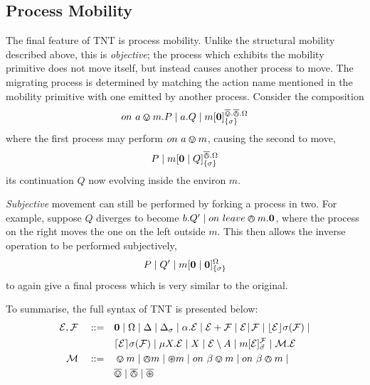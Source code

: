 \documentclass{acm_proc_article-sp}
\begin{document}
\subsection{Process Mobility}
\label{procmob}

The final feature of TNT is process mobility. Unlike the structural
mobility described above, this is \emph{objective}; the process which
exhibits the mobility primitive does not move itself, but instead causes
another process to move.  The migrating process is determined by
matching the action name mentioned in the mobility primitive with one
emitted by another process.  Consider the composition
\begin{displaymath}
  on\ a \varovee m.P \mid a.Q \mid {m}[ \textbf{0} ]^{\overline{\varovee}.\overline{\varowedge}.\Omega}_{\{\sigma\}}
\end{displaymath}
where the first process may perform $on\ a \varovee m$, causing the second
to move,
\begin{displaymath}
P \mid {m}[ \textbf{0} \mid Q ]^{\overline{\varowedge}.\Omega}_{\{\sigma\}}
\end{displaymath}
its continuation $Q$ now evolving inside the environ $m$.

\emph{Subjective} movement can still be performed by forking a process
in two. For example, suppose $Q$ diverges to become $b.Q' \mid
on\ leave \varowedge m.\textbf{0}$, where the process on the right moves the one
on the left outside $m$. This then allows the inverse operation to be
performed subjectively,
\begin{displaymath}
P \mid Q' \mid {m}[ \textbf{0} \mid \textbf{0} ]^{\Omega}_{\{\sigma\}}
\end{displaymath}
to again give a final process which is very similar to the original.

To summarise, the full syntax of TNT is presented below:
\begin{equation*}
  \begin{aligned}
    \text{$\mathcal{E}$}, \text{$\mathcal{F}$} \quad \mathrel{::=} \quad &
      \textbf{0}  \mid
      \Omega \mid
      \Delta \mid
      \Delta_{\sigma} \mid
      \alpha . \text{$\mathcal{E}$}  \mid
      \text{$\mathcal{E}$} + \text{$\mathcal{F}$} \mid
      \text{$\mathcal{E}$} \mathrel{\!|\!} \text{$\mathcal{F}$} \mid
      \lfloor{\text{$\mathcal{E}$}}\rfloor {\sigma} ({\text{$\mathcal{F}$}}) \mid \\
    & \lceil{\text{$\mathcal{E}$}}\rceil {\sigma} ({\text{$\mathcal{F}$}}) \mid 
      \mu X . \text{$\mathcal{E}$} \mid
      X \mid 
      \text{$\mathcal{E}$} \setminus {A} \mid
      {m}[ \text{$\mathcal{E}$} ]^{\text{$\mathcal{F}$}}_{\vec{\sigma}} \mid
      \text{$\mathcal{M}$} . \text{$\mathcal{E}$} \\
   \text{$\mathcal{M}$} \quad \mathrel{::=} \quad & \varovee m \mid \varowedge m \mid \varoast m \mid
      on\ \beta \varovee m \mid on\ \beta \varowedge m \mid \\
   & \overline{\varovee} \mid \overline{\varowedge} \mid \overline{\varoast}
   \end{aligned}
\end{equation*}
\end{document}
